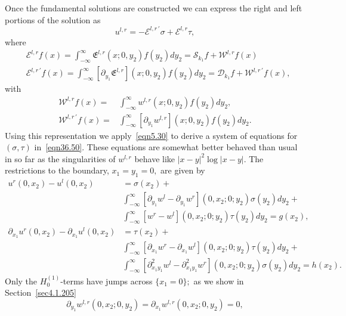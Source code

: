 \documentclass[11pt]{article}
\newcommand\fE{\mathfrak E}
\newcommand\cE{\mathcal E}
\newcommand\cW{\mathcal W}
\newcommand\cS{\mathcal{S}}
\newcommand\cD{\mathcal{D}}
\newcommand\pa{\partial}
\theoremstyle{definition}
\theoremstyle{remark}
\begin{document}
Once the fundamental solutions are constructed we can express the right and left
portions of the solution as
\begin{equation}\label{eqn36.50}
  u^{l,r}=-\cE^{l,r\,'}\sigma+\cE^{l,r}\tau,
\end{equation}
where
\begin{equation}\label{eqn36.34}
  \begin{split}
  &\cE^{l,r}
  f(x)=\int_{-\infty}^{\infty}\fE^{l,r}(x;0,y_2)f(y_2)dy_2=\cS_{k_1}f+\cW^{l,r}f(x)\\
  &\cE^{l,r\, '}
  f(x)=\int_{-\infty}^{\infty}[\pa_{y_1}\fE^{l,r}](x;0,y_2)f(y_2)dy_2=\cD_{k_1}f+\cW^{l,r\,'}f(x),
  \end{split}
\end{equation}
with
\begin{equation}
  \begin{split}
 \cW^{l,r}f(x)=& \int_{-\infty}^{\infty}w^{l,r}(x;0,y_2)f(y_2)dy_2,  \\
  \cW^{l,r\,'}f(x)=&\int_{-\infty}^{\infty}[\pa_{y_1}w^{l,r}](x;0,y_2)f(y_2)dy_2.
  \end{split}
\end{equation}
Using this representation we apply~\eqref{eqn5.30} to derive a system of equations for $(\sigma,\tau)$
in~\eqref{eqn36.50}. These equations are somewhat better behaved than usual in so far as
the singularities of $w^{l,r}$ behave like $|x-y|^2\log|x-y|.$ The restrictions
to the boundary, $x_1=y_1=0,$ are given by
\begin{equation}\label{eqn37.24}
  \begin{split}
    u^r(0,x_2)-u^l(0,x_2)&=\sigma(x_2)+\\ &\int_{-\infty}^{\infty}[\pa_{y_1}w^l-\pa_{y_1}w^r]{(0,x_2;0;y_2)}\sigma(y_2)dy_2+\\
    &\int_{-\infty}^{\infty}[w^r-w^l]{(0,x_2;0;y_2)}\tau(y_2)dy_2=g(x_2),\\
    \pa_{x_1}u^r(0,x_2)-\pa_{x_1}u^l(0,x_2)&=\tau(x_2)+\\ &\int_{-\infty}^{\infty}[\pa_{x_1}w^r-\pa_{x_1}w^l]{(0,x_2;0;y_2)}\tau(y_2)dy_2+\\
    &\int_{-\infty}^{\infty}[\pa^2_{x_1y_1}w^l-\pa^2_{x_1y_1}w^r]{(0,x_2;0;y_2)}\sigma(y_2)dy_2=h(x_2).
  \end{split}
\end{equation}
Only the $H^{(1)}_0$-terms have jumps across $\{x_1=0\};$ as we show in Section~\ref{sec4.1.205}
\begin{equation}
  \pa_{y_1}w^{l,r}(0,x_2;0,y_2)=\pa_{x_1}w^{l,r}(0,x_2;0,y_2)=0,
\end{equation}
\end{document}
